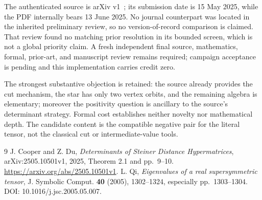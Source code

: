 \documentclass[11pt]{article}
\begin{document}
The authenticated source is arXiv v1~\cite{CD}; its submission date is 15 May 2025, while the PDF internally bears 13 June 2025. No journal counterpart was located in the inherited preliminary review, so no version-of-record comparison is claimed. That review found no matching prior resolution in its bounded screen, which is not a global priority claim. A fresh independent final source, mathematics, formal, prior-art, and manuscript review remains required; campaign acceptance is pending and this implementation carries credit zero.

The strongest substantive objection is retained: the source already provides the cut mechanism, the star has only two vertex orbits, and the remaining algebra is elementary; moreover the positivity question is ancillary to the source's determinant strategy. Formal cost establishes neither novelty nor mathematical depth. The candidate content is the compatible negative pair for the literal tensor, not the classical cut or intermediate-value tools.

\begin{thebibliography}{9}
 J. Cooper and Z. Du, \emph{Determinants of Steiner Distance Hypermatrices}, arXiv:2505.10501v1, 2025, Theorem 2.1 and pp.~9--10. \url{https://arxiv.org/abs/2505.10501v1}.
 L. Qi, \emph{Eigenvalues of a real supersymmetric tensor}, J. Symbolic Comput. \textbf{40} (2005), 1302--1324, especially pp.~1303--1304. DOI: 10.1016/j.jsc.2005.05.007.
\end{thebibliography}
\end{document}
